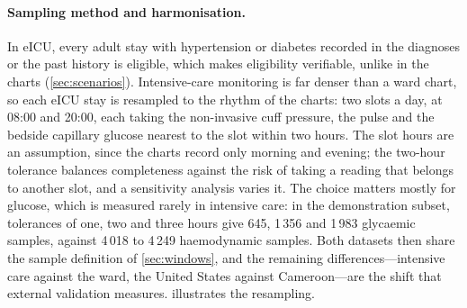 \paragraph{Sampling method and harmonisation.} In eICU, every adult stay with hypertension or diabetes recorded in the diagnoses or the past history is eligible, which makes eligibility verifiable, unlike in the charts (\cref{sec:scenarios}). Intensive-care monitoring is far denser than a ward chart, so each eICU stay is resampled to the rhythm of the charts: two slots a day, at 08:00 and 20:00, each taking the non-invasive cuff pressure, the pulse and the bedside capillary glucose nearest to the slot within two hours. The slot hours are an assumption, since the charts record only morning and evening; the two-hour tolerance balances completeness against the risk of taking a reading that belongs to another slot, and a sensitivity analysis varies it. The choice matters mostly for glucose, which is measured rarely in intensive care: in the demonstration subset, tolerances of one, two and three hours give 645, 1\,356 and 1\,983 glycaemic samples, against 4\,018 to 4\,249 haemodynamic samples. Both datasets then share the sample definition of \cref{sec:windows}, and the remaining differences---intensive care against the ward, the United States against Cameroon---are the shift that external validation measures.  illustrates the resampling.

